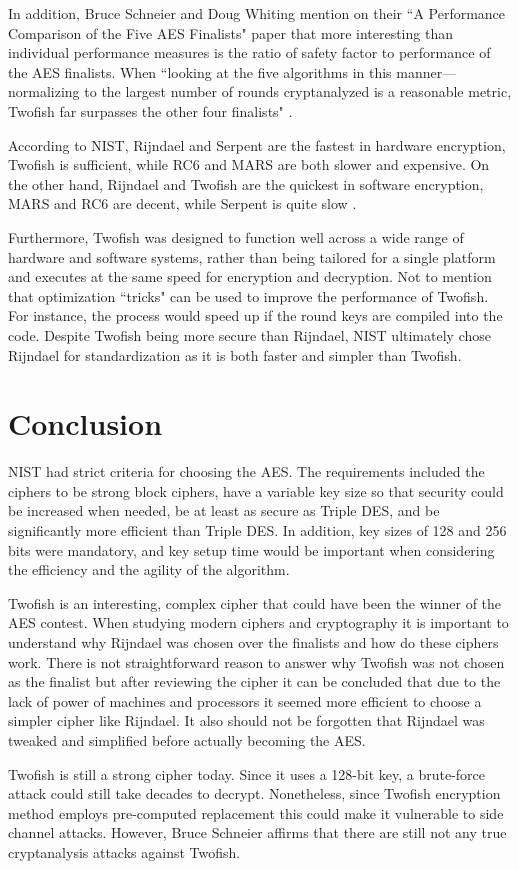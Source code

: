 \documentclass[11pt]{article}
\begin{document}
In addition, Bruce Schneier and Doug Whiting mention on their ``A Performance Comparison of the Five AES Finalists" paper that more interesting than individual performance measures is the ratio of safety factor to performance of the AES finalists. When ``looking at the five algorithms in this manner—normalizing to the largest number of rounds cryptanalyzed is a reasonable metric, Twofish far surpasses the other four finalists" \cite{schneier2000performance}.

According to NIST, Rijndael and Serpent are the fastest in hardware encryption, Twofish is sufficient, while RC6 and MARS are both slower and expensive. On the other hand, Rijndael and Twofish are the quickest in software encryption, MARS and RC6 are decent, while Serpent is quite slow \cite{schneier2000twofish}. 

Furthermore, Twofish was designed to function well across a wide range of hardware and software systems, rather than being tailored for a single platform and executes at the same speed for encryption and decryption. Not to mention that optimization ``tricks" can be used to improve the performance of Twofish. For instance, the process would speed up if the round keys are compiled into the code. Despite Twofish being more secure than Rijndael, NIST ultimately chose Rijndael for standardization as it is both faster and simpler than Twofish.

\section{Conclusion}

NIST had strict criteria for choosing the AES. The requirements included the ciphers to be strong block ciphers, have a variable key size so that security could be increased when needed, be at least as secure as Triple DES, and be significantly more efficient than Triple DES. In addition, key sizes of 128 and 256 bits were mandatory, and key setup time would be important when considering the efficiency and the agility of the algorithm. 

Twofish is an interesting, complex cipher that could have been the winner of the AES contest. When studying modern ciphers and cryptography it is important to understand why Rijndael was chosen over the finalists and how do these ciphers work. There is not straightforward reason to answer why Twofish was not chosen as the finalist but after reviewing the cipher it can be concluded that due to the lack of power of machines and processors it seemed more efficient to choose a simpler cipher like Rijndael. It also should not be forgotten that Rijndael was tweaked and simplified before actually becoming the AES.

Twofish is still a strong cipher today. Since it uses a 128-bit key, a brute-force attack could still take decades to decrypt. Nonetheless, since Twofish encryption method employs pre-computed replacement this could make it vulnerable to side channel attacks. However, Bruce Schneier affirms that there are still not any true cryptanalysis attacks against Twofish.


\printbibliography
\end{document}
